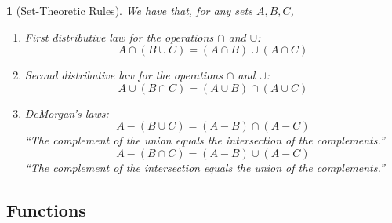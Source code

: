 \documentclass[11pt]{article}
\numberwithin{equation}{section}
\theoremstyle{plain}
\newtheorem{theorem}{\color{ForestGreen}{\textbf{Theorem}}}[section]
\theoremstyle{definition}
\newcommand{\1}{\mathbbm 1}
\begin{document}
\begin{theorem}[Set-Theoretic Rules]
	We have that, for any sets $A, B, C$,
	\begin{enumerate}
		\item First distributive law for the operations $\cap$ and $\cup$:
		\begin{equation}
			A \cap (B \cup C) = (A \cap B) \cup (A \cap C)
		\end{equation}
		\item Second distributive law for the operations $\cap$ and $\cup$:
		\begin{equation}
			A \cup (B \cap C) = (A \cup B) \cap (A \cup C)
		\end{equation}
		\item DeMorgan's laws:
		\begin{equation}
			A - (B \cup C) = (A - B) \cap (A - C)
		\end{equation}
		``The complement of the union equals the intersection of the complements.''
		\begin{equation}
			A - (B \cap C) = (A - B) \cup (A - C)
		\end{equation}
		``The complement of the intersection equals the union of the complements.''
	\end{enumerate}
\end{theorem}

\subsection{Functions}
\end{document}
